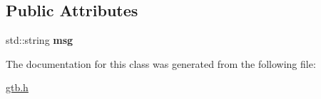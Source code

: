 \subsection*{Public Attributes}
\begin{DoxyCompactItemize}
\item 
\mbox{\label{a00016_af383e83dac310b9bf87b759d08171d5f}} 
std\+::string {\bfseries msg}
\end{DoxyCompactItemize}


The documentation for this class was generated from the following file\+:\begin{DoxyCompactItemize}
\item 
\hyperlink{a00005}{gtb.\+h}\end{DoxyCompactItemize}
